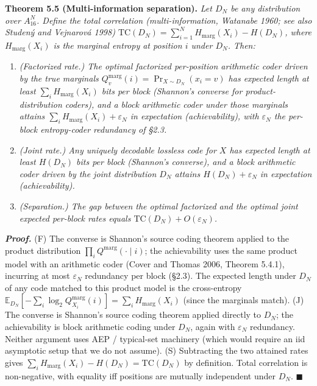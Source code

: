 \documentclass[
]{article}
\begin{document}
\textbf{Theorem 5.5 (Multi-information separation).} \emph{Let $D_N$
be any distribution over $A_{16}^N$. Define the total correlation
(multi-information, Watanabe 1960; see also Studen\'y and Vejnarov\'a
1998)
$\mathrm{TC}(D_N) = \sum_{i=1}^N H_{\text{marg}}(X_i) - H(D_N)$, where
$H_{\text{marg}}(X_i)$ is the marginal entropy at position $i$ under
$D_N$. Then:}
\begin{enumerate}
\item[\textnormal{(F)}] \emph{(Factorized rate.) The optimal factorized
per-position arithmetic coder driven by the true marginals
$Q^{\mathrm{marg}}_v(i) = \Pr_{X \sim D_N}(x_i = v)$ has expected
length \emph{at least} $\sum_i H_{\mathrm{marg}}(X_i)$ bits per block
(Shannon's converse for product-distribution coders), and a block
arithmetic coder under those marginals attains
$\sum_i H_{\mathrm{marg}}(X_i) + \varepsilon_N$ in expectation
(achievability), with $\varepsilon_N$ the per-block entropy-coder
redundancy of §2.3.}
\item[\textnormal{(J)}] \emph{(Joint rate.) Any uniquely decodable lossless
code for $X$ has expected length \emph{at least} $H(D_N)$ bits per
block (Shannon's converse), and a block arithmetic coder driven by
the joint distribution $D_N$ attains
$H(D_N) + \varepsilon_N$ in expectation (achievability).}
\item[\textnormal{(S)}] \emph{(Separation.) The gap between the optimal
factorized and the optimal joint expected per-block rates equals
$\mathrm{TC}(D_N) + O(\varepsilon_N)$.}
\end{enumerate}

\emph{\textbf{Proof.}} (F) The converse is Shannon's source coding
theorem applied to the product distribution
$\prod_i Q^{\mathrm{marg}}(\cdot \mid i)$; the achievability uses
the same product model with an arithmetic coder (Cover and Thomas
2006, Theorem 5.4.1), incurring at most $\varepsilon_N$ redundancy
per block (§2.3). The expected length under $D_N$ of any code matched
to this product model is the cross-entropy
$\mathbb{E}_{D_N}[-\sum_i \log_2 Q^{\mathrm{marg}}_{X_i}(i)] =
\sum_i H_{\mathrm{marg}}(X_i)$ (since the marginals match).
(J) The converse is Shannon's source coding theorem applied directly
to $D_N$; the achievability is block arithmetic coding under $D_N$,
again with $\varepsilon_N$ redundancy. Neither argument uses AEP /
typical-set machinery (which would require an iid asymptotic setup
that we do not assume).
(S) Subtracting the two attained rates gives
$\sum_i H_{\mathrm{marg}}(X_i) - H(D_N) = \mathrm{TC}(D_N)$ by
definition. Total correlation is non-negative, with equality iff
positions are mutually independent under $D_N$.
\hfill$\blacksquare$
\end{document}
